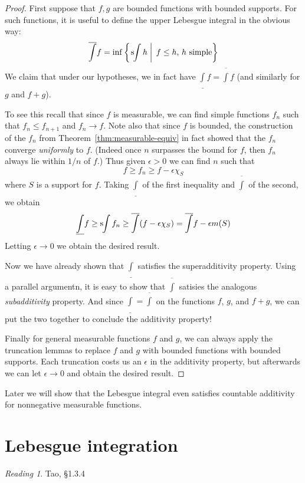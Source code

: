 \documentclass[11pt,oneside]{amsbook}
\newcommand{\sint}{\text{s}\kern-3pt\int}
\newcommand{\lint}{\underline\int}
\newcommand{\ovint}{\overline\int}
\theoremstyle{definition}
\theoremstyle{plain}
\theoremstyle{definition}
\theoremstyle{remark}
\newtheorem*{reading}{Reading}
\numberwithin{equation}{section}
\numberwithin{figure}{section}
\begin{document}
\begin{proof}
  First suppose that $f,g$ are bounded functions with bounded supports. For such functions, it is useful to define the upper Lebesgue integral in the obvious way:
  \[\ovint f=\inf\left\{\left.\sint h\;\right|\;f\leq h\text{, $h$ simple}\right\}
  \]
  We claim that under our hypotheses, we in fact have $\lint f=\ovint f$ (and similarly for $g$ and $f+g$).

  To see this recall that since $f$ is measurable, we can find simple functions $f_n$ such that $f_n\leq f_{n+1}$ and $f_n\to f$. Note also that since $f$ is bounded, the construction of the $f_n$ from Theorem~\ref{thm:measurable-equiv} in fact showed that the $f_n$ converge \emph{uniformly} to $f$. (Indeed once $n$ surpasses the bound for $f$, then $f_n$ always lie within $1/n$ of $f$.) Thus given $\epsilon>0$ we can find $n$ such that
  \[f\geq f_n\geq f-\epsilon\chi_S
  \]
  where $S$ is a support for $f$. Taking $\lint$ of the first inequality and $\ovint$ of the second, we obtain
  \[\lint f\geq\sint f_n\geq\ovint(f-\epsilon\chi_S)=\ovint f-\epsilon m(S)
  \]
  Letting $\epsilon\to0$ we obtain the desired result.

  Now we have already shown that $\lint$ satisfies the superadditivity property. Using a parallel argumentn, it is easy to show that $\ovint$ satisies the analogous \emph{subadditivity} property. And since $\lint=\ovint$ on the functions $f$, $g$, and $f+g$, we can put the two together to conclude the additivity property!

  Finally for general measurable functions $f$ and $g$, we can always apply the truncation lemmas to replace $f$ and $g$ with bounded functions with bounded supports. Each truncation costs us an $\epsilon$ in the additivity property, but afterwards we can let $\epsilon\to0$ and obtain the desired result.
\end{proof}

Later we will show that the Lebesgue integral even satisfies countable additivity for nonnegative measurable functions.

\newpage
\section{Lebesgue integration}

\begin{reading}
  Tao, \S 1.3.4
\end{reading}
\end{document}
